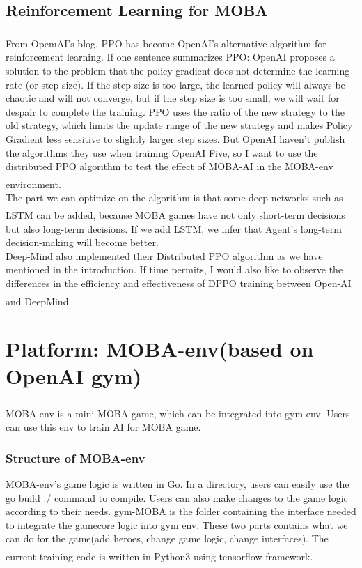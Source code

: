\documentclass[runningheads]{llncs}
\newcommand{\upcite}[1]{\textsuperscript{\textsuperscript{\cite{#1}}}}
\begin{document}
\subsection{Reinforcement Learning for MOBA}
\qquad From OpemAI's blog\upcite{OpenAI-baselines-ppo}, PPO has become OpenAI's alternative algorithm for reinforcement learning. If one sentence summarizes PPO: OpenAI proposes a solution to the problem that the policy gradient does not determine the learning rate (or step size). If the step size is too large, the learned policy will always be chaotic and will not converge, but if the step size is too small, we will wait for despair to complete the training. PPO uses the ratio of the new strategy to the old strategy, which limits the update range of the new strategy and makes Policy Gradient less sensitive to slightly larger step sizes. But OpenAI haven't publish the algorithms they use when training OpenAI Five, so I want to use the distributed PPO algorithm to test the effect of MOBA-AI in the MOBA-env environment\upcite{OpenAI-PPO}.\\

The part we can optimize on the algorithm is that some deep networks such as LSTM\upcite{LSTM} can be added, because MOBA games have not only short-term decisions but also long-term decisions. If we add LSTM, we infer that Agent's long-term decision-making will become better.\\

Deep-Mind also implemented their Distributed PPO algorithm as we have mentioned in the introduction. If time permits, I would also like to observe the differences in the efficiency and effectiveness of DPPO training between Open-AI and DeepMind.\upcite{Deep-Mind}

\section{Platform: MOBA-env(based on OpenAI gym)}
\qquad MOBA-env\upcite{MOBA-env} is a mini MOBA game, which can be integrated into gym env. Users can use this env to train AI for MOBA game.
\subsubsection{Structure of MOBA-env}
MOBA-env's game logic is written in Go. In a directory, users can easily use the go build ./ command to compile. Users can also make changes to the game logic according to their needs. gym-MOBA is the folder containing the interface needed to integrate the gamecore logic into gym env. These two parts contains what we can do for the game(add heroes, change game logic, change interfaces).
The current training code is written in Python3 using tensorflow\upcite{tensorflow} framework.
\end{document}
